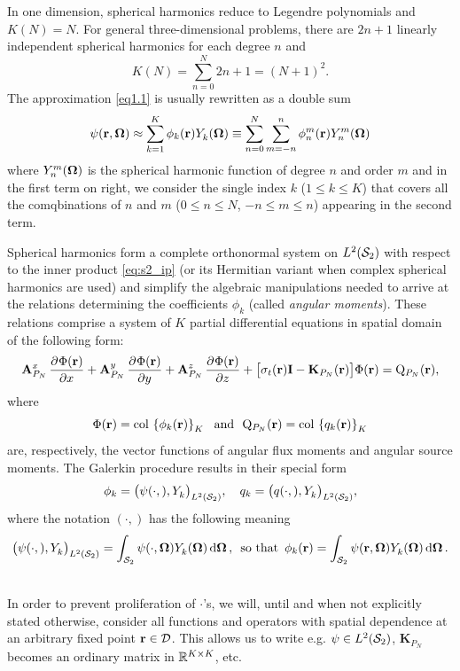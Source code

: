In one dimension, spherical harmonics reduce to 
Legendre polynomials and $ K(N) = N$.
For general three-dimensional problems, there are $2n + 1$ linearly independent spherical harmonics for each degree $n$ 
and 
$$ 
	K(N) = \sum_{n=0}^{N} 2n + 1 = (N+1)^2.
$$
%
The approximation \eqref{eq1.1} is usually rewritten as a double sum
\begin{equation}\label{eq:pn_approx}
	\psi(\br,\bomega) \approx \sum_{k=1}^{ K} \phi_k(\br)\Y{k}{}(\bomega) \equiv
	\suma[n]{0}{N}\suma[m]{-n}{n}\angmom{n}{m}(\br)\Y{n}{m}(\bomega)
\end{equation}
where $\Y{n}{m}(\bomega)$ is the spherical harmonic function of degree $n$ and order $m$
and in the first term on right, we consider the single index $k$ ($1 \leq k \leq  K$) that covers all the comqbinations
of $n$ and $m$ ($0 \leq n \leq N$, $-n\leq m \leq n$) appearing in the second term.

Spherical harmonics form a complete orthonormal system on $\Lp[2](\Sphere)$ with respect to the inner product
\eqref{eq:s2_ip} (or its Hermitian variant when complex spherical harmonics are used) and simplify the algebraic
manipulations needed to arrive at the relations determining the coefficients $\phi_k$ (called \textit{angular moments}).
These relations comprise a system of $K$
partial differential equations in spatial domain 
of the following form:
\begin{equation}\label{eq:pn1}
	\mat{A}^x_{P_N}\,\pd{\Phi(\br)}{x} + \mat{A}^y_{P_N}\,\pd{\Phi(\br)}{y} + \mat{A}^z_{P_N}\,\pd{\Phi(\br)}{z} +
	\bigl[\sigma_t(\br)\mat{I} - \mathbf{K}_{P_N}(\br)\bigr]\Phi(\br) = \mathrm{Q}_{P_N}(\br),
\end{equation}
where 
\begin{equation}\label{eq:pn_vectors}
	\Phi(\br) = \col\left\{\phi_k(\br)\right\}_{\idxset{K}} \ \text{ and }\ 
	\mathrm{Q}_{P_N}(\br) = \col\left\{q_k(\br)\right\}_{\idxset{K}}
\end{equation}
are, respectively, the vector functions of angular flux
moments and angular source moments.
The
Galerkin procedure results in their special form
\begin{equation}\label{eq:pn_vars}
	\phi_k = \ipsl{\psi(\cdot,)}{\Y{k}{}},\quad q_k = \ipsl{q(\cdot,)}{\Y{k}{}},
\end{equation}
where the notation $(\cdot,)$ has the following meaning
$$
 	\ipsl{\psi(\cdot,)}{\Y{k}{}} = \intA{\psi(\cdot,\bomega) \Y{k}{}(\bomega)},\ \, \mbox{so
 	that}\ \, \phi_k(\br) = \intA{\psi(\br,\bomega) \Y{k}{}(\bomega)}. 
$$
\begin{remark}[\textsc{Suppression of spatial dependence}]\mbox{}\\
In order to prevent proliferation of $\cdot$'s, we will, until  and when not explicitly stated
otherwise, consider all functions and operators with spatial dependence at an arbitrary fixed point $\br\in\VV$. This
allows us to write e.g. $\psi\in\Lp[2](\Sphere)$, $\mathbf{K}_{P_N}$ becomes an ordinary matrix in $\R[K\times K]$,
etc.
\end{remark}

